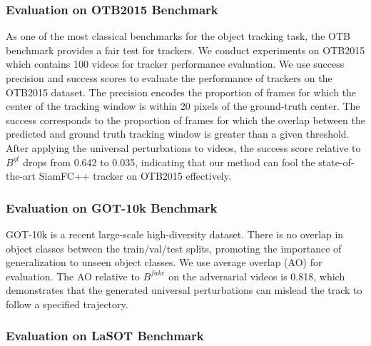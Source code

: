 \documentclass{article}
\begin{document}
\subsubsection{Evaluation on OTB2015 Benchmark}

As one of the most classical benchmarks for the object tracking task, the OTB benchmark provides a fair test for trackers. We conduct experiments on OTB2015 \cite{OTB} which contains 100 videos for tracker performance evaluation.
We use success precision and success scores to evaluate the performance of trackers on the OTB2015 dataset.
The precision encodes the proportion of frames for which the center of the tracking window is within 20 pixels of the ground-truth center. The success corresponds to the proportion of frames for which the overlap between the predicted and ground truth tracking window is greater than a given threshold.
After applying the universal perturbations to videos, the success score relative to $B^{gt}$ drops from 0.642 to 0.035, indicating that our method can fool the state-of-the-art SiamFC++ tracker on OTB2015 effectively.

\subsubsection{Evaluation on GOT-10k Benchmark}

GOT-10k \cite{GOT-10k} is a recent large-scale high-diversity dataset. There is no overlap in object classes between the train/val/test splits, promoting the importance of generalization to unseen object classes.
We use average overlap (AO) for evaluation.
The AO relative to $B^{fake}$ on the adversarial videos is 0.818, which demonstrates that the generated universal perturbations can mislead the track to follow a specified trajectory.

\subsubsection{Evaluation on LaSOT Benchmark}
\end{document}

